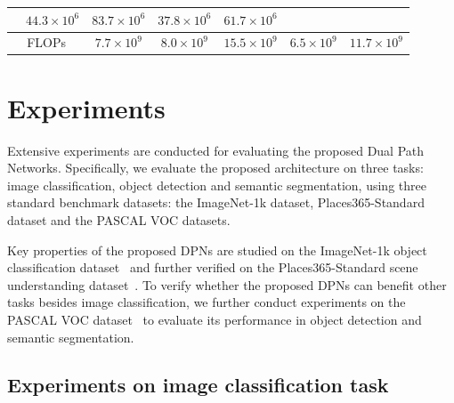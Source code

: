 \documentclass{article}
\begin{document}
\begin{table}[t]
{\begin{tabular}{c|c|c|c|c|c|c}
    & $\mathbf{44.3} \times 10^6$    %
    & $\mathbf{83.7} \times 10^6$    %
    & $\mathbf{37.8} \times 10^6$    %
    & $\mathbf{61.7} \times 10^6$ \\ %
    \midrule
    \multicolumn{2}{c|}{FLOPs} 
    & $\mathbf{7.7}  \times 10^9$    %
    & $\mathbf{8.0}  \times 10^9$    %
    & $\mathbf{15.5} \times 10^9$    %
    & $\mathbf{6.5}  \times 10^9$    %
    & $\mathbf{11.7} \times 10^9$ \\ %
    \bottomrule
    \end{tabular}
  }
  \label{tab_detail_settings}
\end{table}


% 
%
%
%

\section{Experiments}

Extensive experiments are conducted for evaluating the proposed Dual Path Networks. Specifically, we evaluate the proposed architecture on three tasks: image classification, object detection and semantic segmentation, using three standard benchmark datasets: the ImageNet-1k dataset, Places365-Standard dataset and the PASCAL VOC datasets.

Key properties of the proposed DPNs are studied on the ImageNet-1k object classification dataset~\citep{ILSVRC15} and further verified on the Places365-Standard scene understanding dataset~\citep{zhou2016places}. To verify whether the proposed DPNs can benefit other tasks besides image classification, we further conduct experiments on the PASCAL VOC dataset~\citep{pascal2010} to evaluate its performance in object detection and semantic segmentation.

\subsection{Experiments on image classification task}
\end{document}
